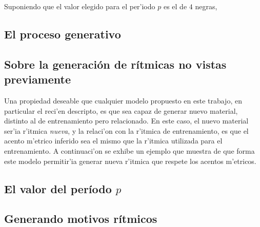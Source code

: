 Suponiendo que el valor elegido para el per'iodo $p$ es el de $4$ negras, 

\subsection{El proceso generativo}

\subsection{Sobre la generaci\'on de r\'itmicas no vistas previamente}
Una propiedad deseable que cualquier modelo propuesto en este trabajo, en particular el reci'en descripto, es que sea capaz de generar nuevo material, distinto al de entrenamiento
pero relacionado. En este caso, el nuevo material ser'ia r'itmica \emph{nueva}, y la relaci'on con la r'itmica de entrenamiento, es que el acento m'etrico inferido sea el mismo
que la r'itmica utilizada para el entrenamiento. A continuaci'on se exhibe un ejemplo que muestra de que forma este modelo permitir'ia generar nueva r'itmica que respete 
los acentos m'etricos.


\subsection{El valor del per\'iodo $p$}

\subsection{Generando motivos r\'itmicos}


%
%
%
%
%
%
%
%
%
%
%
%
%
%
%
%
%
%
%    
%
%
